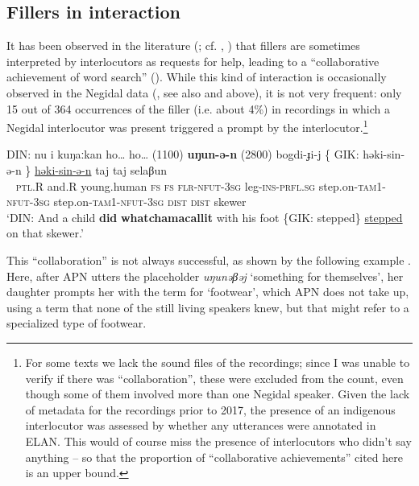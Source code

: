 \documentclass[output=paper]{langscibook}
\begin{document}
\subsection{Fillers in interaction}
\label{sec:pakendorf:5.4}
It has been observed in the literature (\citealt[499]{HayashiYoon2006}; cf. \citealt[146--147]{LeSourd2003}, \citealt[156--158]{Keevallik2010}) that fillers are sometimes interpreted by interlocutors as requests for help, leading to a “collaborative achievement of word search” (\citealt[499]{HayashiYoon2006}). While this kind of interaction is occasionally observed in the Negidal data (, see also  and  above), it is not very frequent: only 15 out of 364 occurrences of the filler (i.e. about 4\%) in recordings in which a Negidal interlocutor was present triggered a prompt by the interlocutor.\footnote{For some texts we lack the sound files of the recordings; since I was unable to verify if there was “collaboration”, these were excluded from the count, even though some of them involved more than one Negidal speaker. Given the lack of metadata for the recordings prior to 2017, the presence of an indigenous interlocutor was assessed by whether any utterances were annotated in ELAN. This would of course miss the presence of interlocutors who didn’t say anything – so that the proportion of “collaborative achievements” cited here is an upper bound.}

\ea \label{ex:pakendorf:58}
\gll \textup{DIN:}
	nu
	i
	kuŋaːkan
	ho…	ho…
	\textup{(1100)} \textbf{uŋun-ə-n} \textup{(2800)}
	bogdi-ɟi-j
	\textup{\{}
	\textup{GIK:}
	həki-sin-ə-n
	\textup{\}}
	\uline{həki-sin-ə-n} taj taj selaβun\\
     ~{}
     \textsc{ptl.R}
     and.R
     young.human
     \textsc{fs} \textsc{fs}
     {} \textsc{flr-nfut-3sg} {}
     leg-\textsc{ins-prfl.sg}
     {}
     {}
     step.on-\textsc{tam1-nfut-3sg}
     {}
     step.on-\textsc{tam1-nfut-3sg} \textsc{dist} \textsc{dist} skewer\\
\glt ‘DIN: And a child \textbf{did} \textbf{whatchamacallit} with his foot \{GIK: stepped\} \uline{stepped} on that skewer.’ 
\z

This “collaboration” is not always successful, as shown by the following example . Here, after APN utters the placeholder \textit{uŋunəβəj} ‘something for themselves’, her daughter prompts her with the term for ‘footwear’, which APN does not take up, using a term that none of the still living speakers knew, but that might refer to a specialized type of footwear.
\end{document}
